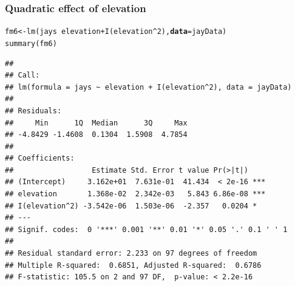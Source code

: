 \documentclass[color=usenames,dvipsnames]{beamer}\usepackage[]{graphicx}\usepackage[]{color}
\makeatletter
\newcommand{\hlnum}[1]{\textcolor[rgb]{0.69,0.494,0}{#1}}%
\newcommand{\hlopt}[1]{\textcolor[rgb]{0,0,0}{#1}}%
\newcommand{\hlstd}[1]{\textcolor[rgb]{0,0,0}{#1}}%
\newcommand{\hlkwb}[1]{\textcolor[rgb]{0,0.341,0.682}{#1}}%
\newcommand{\hlkwc}[1]{\textcolor[rgb]{0,0,0}{\textbf{#1}}}%
\newcommand{\hlkwd}[1]{\textcolor[rgb]{0.004,0.004,0.506}{#1}}%
\newenvironment{kframe}{%
 \def\at@end@of@kframe{}%
 \ifinner\ifhmode%
  \def\at@end@of@kframe{\end{minipage}}%
  \begin{minipage}{\columnwidth}%
 \fi\fi%
 \def\FrameCommand##1{\hskip\@totalleftmargin \hskip-\fboxsep
 \colorbox{shadecolor}{##1}\hskip-\fboxsep
     \hskip-\linewidth \hskip-\@totalleftmargin \hskip\columnwidth}%
 \MakeFramed {\advance\hsize-\width
   \@totalleftmargin\z@ \linewidth\hsize
   \@setminipage}}%
 {\par\unskip\endMakeFramed%
 \at@end@of@kframe}
\newenvironment{knitrout}{}{} %
\makeatother
\begin{document}
\begin{frame}[fragile]
  \frametitle{Quadratic effect of elevation}
\begin{knitrout}\scriptsize
{}\color{fgcolor}\begin{kframe}
\begin{alltt}
\hlstd{fm6} \hlkwb{<-} \hlkwd{lm}\hlstd{(jays} \hlopt{~} \hlstd{elevation}\hlopt{+}\hlkwd{I}\hlstd{(elevation}\hlopt{^}\hlnum{2}\hlstd{),} \hlkwc{data}\hlstd{=jayData)}
\hlkwd{summary}\hlstd{(fm6)}
\end{alltt}
\begin{verbatim}
## 
## Call:
## lm(formula = jays ~ elevation + I(elevation^2), data = jayData)
## 
## Residuals:
##     Min      1Q  Median      3Q     Max 
## -4.8429 -1.4608  0.1304  1.5908  4.7854 
## 
## Coefficients:
##                  Estimate Std. Error t value Pr(>|t|)    
## (Intercept)     3.162e+01  7.631e-01  41.434  < 2e-16 ***
## elevation       1.368e-02  2.342e-03   5.843 6.86e-08 ***
## I(elevation^2) -3.542e-06  1.503e-06  -2.357   0.0204 *  
## ---
## Signif. codes:  0 '***' 0.001 '**' 0.01 '*' 0.05 '.' 0.1 ' ' 1
## 
## Residual standard error: 2.233 on 97 degrees of freedom
## Multiple R-squared:  0.6851,	Adjusted R-squared:  0.6786 
## F-statistic: 105.5 on 2 and 97 DF,  p-value: < 2.2e-16
\end{verbatim}
\end{kframe}
\end{knitrout}
\end{frame}
\end{document}
